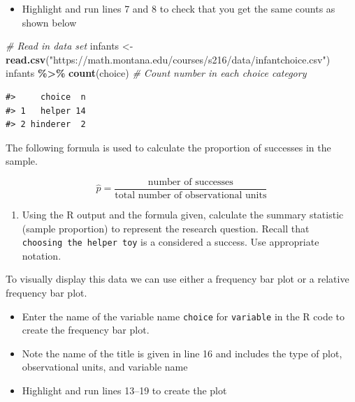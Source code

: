 \documentclass[
]{report}
\newenvironment{Shaded}{\begin{snugshade}}{\end{snugshade}}
\newcommand{\CommentTok}[1]{\textcolor[rgb]{0.56,0.35,0.01}{\textit{#1}}}
\newcommand{\FunctionTok}[1]{\textcolor[rgb]{0.13,0.29,0.53}{\textbf{#1}}}
\newcommand{\NormalTok}[1]{#1}
\newcommand{\OtherTok}[1]{\textcolor[rgb]{0.56,0.35,0.01}{#1}}
\newcommand{\SpecialCharTok}[1]{\textcolor[rgb]{0.81,0.36,0.00}{\textbf{#1}}}
\newcommand{\StringTok}[1]{\textcolor[rgb]{0.31,0.60,0.02}{#1}}
\providecommand{\tightlist}{%
  \setlength{\itemsep}{0pt}\setlength{\parskip}{0pt}}
\begin{document}
\begin{itemize}
\tightlist
\item
  Highlight and run lines 7 and 8 to check that you get the same counts as shown below
\end{itemize}

\begin{Shaded}
\begin{Highlighting}[]
 \CommentTok{\# Read in data set}
\NormalTok{infants }\OtherTok{\textless{}{-}} \FunctionTok{read.csv}\NormalTok{(}\StringTok{"https://math.montana.edu/courses/s216/data/infantchoice.csv"}\NormalTok{)}
\NormalTok{infants }\SpecialCharTok{\%\textgreater{}\%} \FunctionTok{count}\NormalTok{(choice)  }\CommentTok{\# Count number in each choice category}
\end{Highlighting}
\end{Shaded}

\begin{verbatim}
#>     choice  n
#> 1   helper 14
#> 2 hinderer  2
\end{verbatim}

The following formula is used to calculate the proportion of successes in the sample.

\[\hat{p} = \frac{\mbox{number of successes}}{\mbox{total number of observational units}}\]

\begin{enumerate}
\def\labelenumi{\arabic{enumi}.}
\setcounter{enumi}{2}
\tightlist
\item
  Using the R output and the formula given, calculate the summary statistic (sample proportion) to represent the research question. Recall that \texttt{choosing\ the\ helper\ toy} is a considered a success. Use appropriate notation.
\end{enumerate}

\vspace{0.5in}

To visually display this data we can use either a frequency bar plot or a relative frequency bar plot.

\begin{itemize}
\item
  Enter the name of the variable name \texttt{choice} for \texttt{variable} in the R code to create the frequency bar plot.
\item
  Note the name of the title is given in line 16 and includes the type of plot, observational units, and variable name
\item
  Highlight and run lines 13--19 to create the plot
\end{itemize}
\end{document}
